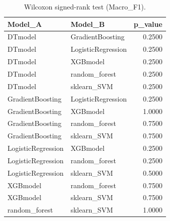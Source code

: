 \begin{table}[t]
\centering
\begin{tabular}{llr}
\toprule
Model_A & Model_B & p_value \\
\midrule
DTmodel & GradientBoosting & 0.2500 \\
DTmodel & LogisticRegression & 0.2500 \\
DTmodel & XGBmodel & 0.2500 \\
DTmodel & random_forest & 0.2500 \\
DTmodel & sklearn_SVM & 0.2500 \\
GradientBoosting & LogisticRegression & 0.2500 \\
GradientBoosting & XGBmodel & 1.0000 \\
GradientBoosting & random_forest & 0.7500 \\
GradientBoosting & sklearn_SVM & 0.7500 \\
LogisticRegression & XGBmodel & 0.2500 \\
LogisticRegression & random_forest & 0.2500 \\
LogisticRegression & sklearn_SVM & 0.5000 \\
XGBmodel & random_forest & 0.7500 \\
XGBmodel & sklearn_SVM & 0.7500 \\
random_forest & sklearn_SVM & 1.0000 \\
\bottomrule
\end{tabular}
\caption{Wilcoxon signed-rank test (Macro_F1).}
\label{tab:wilcoxon_Macro_F1}
\end{table}